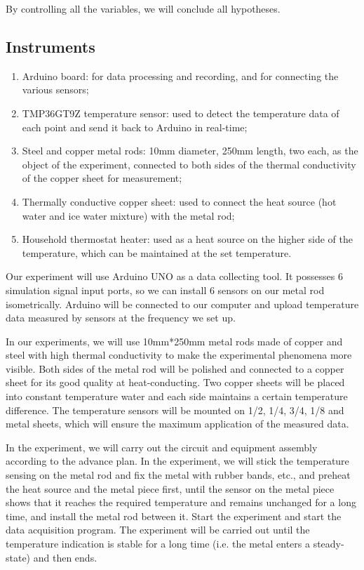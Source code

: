 \documentclass[a4paper,12pt]{article}
\begin{document}
By controlling all the variables, we will conclude all hypotheses.


\subsection{Instruments}
\begin{enumerate}
	\item Arduino board: for data processing and recording, and for connecting the various sensors;
	\item TMP36GT9Z temperature sensor: used to detect the temperature data of each point and send it back to Arduino in real-time;
	\item Steel and copper metal rods: 10mm diameter, 250mm length, two each, as the object of the experiment, connected to both sides of the thermal conductivity of the copper sheet for measurement;
	\item Thermally conductive copper sheet: used to connect the heat source (hot water and ice water mixture) with the metal rod;
	\item Household thermostat heater: used as a heat source on the higher side of the temperature, which can be maintained at the set temperature.
\end{enumerate}






Our experiment will use Arduino UNO as a data collecting tool. It possesses 6 simulation signal input ports, so we can install 6 sensors on our metal rod isometrically. Arduino will be connected to our computer and upload temperature data measured by sensors at the frequency we set up.


In our experiments, we will use 10mm*250mm metal rods made of copper and steel with high thermal conductivity to make the experimental phenomena more visible.\cite{enwiki:1038093320} Both sides of the metal rod will be polished and connected to a copper sheet for its good quality at heat-conducting. Two copper sheets will be placed into constant temperature water and each side maintains a certain temperature difference. The temperature sensors will be mounted on 1/2, 1/4, 3/4, 1/8 and metal sheets, which will ensure the maximum application of the measured data.


In the experiment, we will carry out the circuit and equipment assembly according to the advance plan. In the experiment, we will stick the temperature sensing on the metal rod and fix the metal with rubber bands, etc., and preheat the heat source and the metal piece first, until the sensor on the metal piece shows that it reaches the required temperature and remains unchanged for a long time, and install the metal rod between it. Start the experiment and start the data acquisition program. The experiment will be carried out until the temperature indication is stable for a long time (i.e. the metal enters a steady-state) and then ends.
\end{document}
